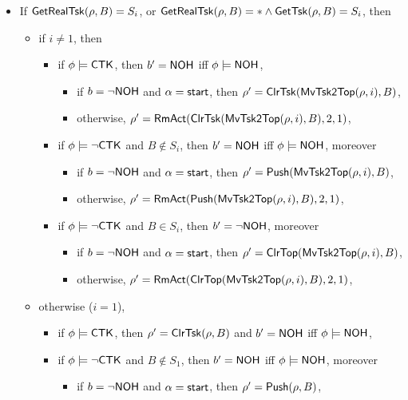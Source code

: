 \smallskip
\noindent {}
\smallskip
\begin{itemize}
	\item If $\mathsf{GetRealTsk}(\rho, B) = S_i$,
	or $ \mathsf{GetRealTsk}(\rho, B) = * \wedge \mathsf{GetTsk}(\rho, B) = S_i$, then
	\begin{itemize}
		\item if $i\neq 1$, then 
		\begin{itemize}
			\item if $\phi\models{\sf CTK}$, then $b' = {\sf NOH}$ iff $\phi \models {\sf NOH}$, 
			\begin{itemize}
				\item if $b = \neg{\sf NOH}$ and $\alpha = {\mathsf{start} }$, then $\rho' = \mathsf{ClrTsk}(\mathsf{MvTsk2Top}(\rho,i), B)$,
				\item otherwise, $\rho' = \mathsf{RmAct}(\mathsf{ClrTsk}(\mathsf{MvTsk2Top}(\rho,i), B), 2, 1)$,
			\end{itemize}
			\item if $\phi\models\neg{\sf CTK}$ and $B \notin S_i$, then $b' = {\sf NOH}$ iff $\phi \models {\sf NOH}$, moreover
			\begin{itemize}
				\item if $b = \neg{\sf NOH}$ and $\alpha = {\mathsf{start} }$, then $\rho' = \mathsf{Push}(\mathsf{MvTsk2Top}(\rho,i), B)$,
				\item otherwise, $\rho' = \mathsf{RmAct}(\mathsf{Push}(\mathsf{MvTsk2Top}(\rho,i), B), 2, 1)$,
			\end{itemize}
			\item if $\phi\models\neg{\sf CTK}$ and $B \in S_i$, then $b' = \neg {\sf NOH}$, moreover
			\begin{itemize}
				\item if $b = \neg{\sf NOH}$ and $\alpha = {\mathsf{start} }$, then $\rho' = \mathsf{ClrTop}(\mathsf{MvTsk2Top}(\rho,i), B)$,
				\item otherwise, $\rho' = \mathsf{RmAct}(\mathsf{ClrTop}(\mathsf{MvTsk2Top}(\rho,i), B), 2, 1)$,
			\end{itemize}
		\end{itemize}
		\item otherwise ($i = 1$),
		\begin{itemize}
			\item if $\phi\models{\sf CTK}$, then $\rho' = \mathsf{ClrTsk}(\rho, B)$ and $b' = {\sf NOH}$ iff $\phi \models {\sf NOH}$, 
			\item if $\phi\models\neg{\sf CTK}$ and $B \notin S_1$, then $b' = {\sf NOH}$ iff $\phi \models {\sf NOH}$, moreover
			\begin{itemize}
				\item if $b = \neg{\sf NOH}$ and $\alpha = {\mathsf{start} }$, then $\rho' = \mathsf{Push}(\rho, B)$,

\end{itemize}
\end{itemize}
\end{itemize}
\end{itemize}

